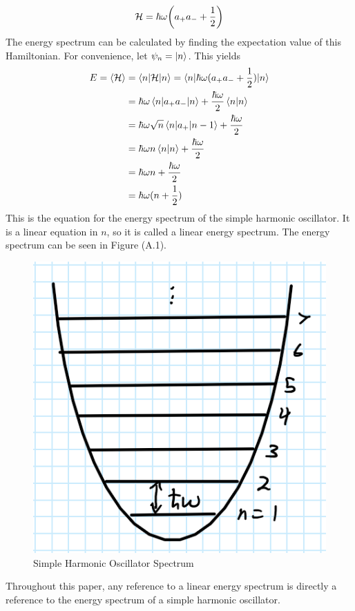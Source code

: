 \begin{equation}
    \mathcal{H}=\hbar\omega\qty(a_+a_-+\frac{1}{2})
\end{equation}
The energy spectrum can be calculated by finding the expectation value of this Hamiltonian. For convenience, let $\psi_n=\ket{n}$. This yields 
\begin{align}
    E=\left<{\mathcal{H}}\right>&=\braket{n|\mathcal{H}|n}=\braket{n|\hbar\omega (a_+a_-+\frac{1}{2})|n}\nonumber\\
    &=\hbar\omega \braket{n|a_+a_-|n}+\frac{\hbar\omega}{2}\braket{n|n}\nonumber\\
    &=\hbar\omega \sqrt{n}\braket{n|a_+|n-1}+\frac{\hbar\omega}{2}\nonumber\\
    &=\hbar\omega n \braket{n|n}+\frac{\hbar\omega}{2}\nonumber\\
    &=\hbar\omega n +\frac{\hbar\omega}{2}\nonumber\\
    &=\hbar\omega(n+\frac{1}{2})
\end{align}
This is the equation for the energy spectrum of the simple harmonic oscillator. It is a linear equation in $n$, so it is called a linear energy spectrum. The energy spectrum can be seen in Figure (A.1).
\begin{figure}
    \centering
    \includegraphics[scale=0.5]{figures/pdf/SHMspectrum.PNG}
    \caption{Simple Harmonic Oscillator Spectrum}
    \label{fig:Simple Harmonic Oscillator Spectrum}
\end{figure}Throughout this paper, any reference to a linear energy spectrum is directly a reference to the energy spectrum of a simple harmonic oscillator. 

